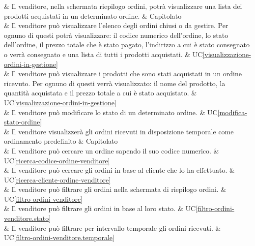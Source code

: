  & Il venditore, nella schermata riepilogo ordini, potrà visualizzare una lista dei prodotti acquistati in un determinato ordine. & Capitolato \\

 & Il venditore può visualizzare l'elenco degli ordini chiusi o da gestire. Per ognuno di questi potrà visualizzare: il codice numerico dell’ordine, lo stato dell’ordine, il prezzo totale che è stato pagato, l’indirizzo a cui è stato consegnato o verrà consegnato e una lista di tutti i prodotti acquistati. & UC\ref{visualizzazione-ordini-in-gestione} \\

 & Il venditore può visualizzare i prodotti che sono stati acquistati in un ordine ricevuto. Per ognuno di questi verrà visualizzato: il nome del prodotto, la quantità acquistata e il prezzo totale a cui è stato acquistato. & UC\ref{visualizzazione-ordini-in-gestione} \\

 & Il venditore può modificare lo stato di un determinato ordine. & UC\ref{modifica-stato-ordine} \\

 & Il venditore visualizzerà gli ordini ricevuti in disposizione temporale come ordinamento predefinito & Capitolato \\

 & Il venditore può cercare un ordine sapendo il suo codice numerico. & UC\ref{ricerca-codice-ordine-venditore} \\
     
 & Il venditore può cercare gli ordini in base al cliente che lo ha effettuato. & UC\ref{ricerca-cliente-ordine-venditore} \\
    
 & Il venditore può filtrare gli ordini nella schermata di riepilogo ordini. & UC\ref{filtro-ordini-venditore} \\
    
 & Il venditore può filtrare gli ordini in base al loro stato. & UC\ref{filtro-ordini-venditore.stato} \\
    
 & Il venditore può filtrare per intervallo temporale gli ordini ricevuti. & UC\ref{filtro-ordini-venditore.temporale} \\
    
